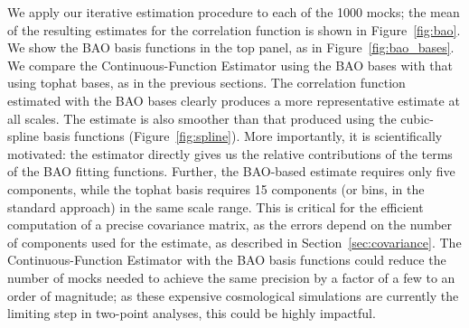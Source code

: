 \documentclass[modern]{aastex62}
\newcommand{\Est}{The Continuous-Function Estimator\xspace}
\newcommand{\est}{the Continuous-Function Estimator\xspace}
\begin{document}
We apply our iterative estimation procedure to each of the 1000 mocks; the mean of the resulting estimates for the correlation function is shown in Figure~\ref{fig:bao}.
We show the BAO basis functions in the top panel, as in Figure~\ref{fig:bao_bases}.
We compare \est using the BAO bases with that using tophat bases, as in the previous sections.
The correlation function estimated with the BAO bases clearly produces a more representative estimate at all scales.
The estimate is also smoother than that produced using the cubic-spline basis functions (Figure~\ref{fig:spline}).
More importantly, it is scientifically motivated: the estimator directly gives us the relative contributions of the terms of the BAO fitting functions.
Further, the BAO-based estimate requires only five components, while the tophat basis requires 15 components (or bins, in the standard approach) in the same scale range.
This is critical for the efficient computation of a precise covariance matrix, as the errors depend on the number of components used for the estimate, as described in Section~\ref{sec:covariance}.
\Est with the BAO basis functions could reduce the number of mocks needed to achieve the same precision by a factor of a few to an order of magnitude; as these expensive cosmological simulations are currently the limiting step in two-point analyses, this could be highly impactful.
\end{document}
